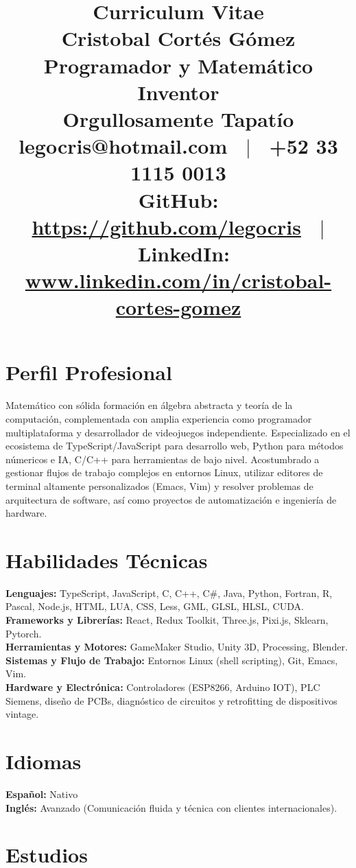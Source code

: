 \documentclass{article}
\title{\vspace{-1.5cm} Curriculum Vitae \\ \Huge{Cristobal Cortés Gómez} \\ \large{Programador y Matemático Inventor} \\ \normalsize{Orgullosamente Tapatío} \\ 
\vspace{0.3cm}
\normalsize{
legocris@hotmail.com \ $|$ \ +52 33 1115 0013 \\
GitHub: \url{https://github.com/legocris} \ $|$ \ LinkedIn: \url{www.linkedin.com/in/cristobal-cortes-gomez}
}
\vspace{-1cm}}
\author{}
\date{}
\begin{document}
\maketitle

\section*{Perfil Profesional}
Matemático con sólida formación en álgebra abstracta y teoría de la computación, complementada con amplia experiencia como programador multiplataforma y  desarrollador de videojuegos independiente. Especializado en el ecosistema de TypeScript/JavaScript para desarrollo web, Python para métodos númericos e IA, C/C++ para herramientas de bajo nivel. Acostumbrado a gestionar flujos de trabajo complejos en entornos Linux, utilizar editores de terminal altamente personalizados (Emacs, Vim) y resolver problemas de arquitectura de software, así como proyectos de automatización e ingeniería de hardware.

\section*{Habilidades Técnicas}
\textbf{Lenguajes:} TypeScript, JavaScript, C, C++, C\#, Java, Python, Fortran, R, Pascal, Node.js, HTML, LUA, CSS, Less, GML, GLSL, HLSL, CUDA. \\
\textbf{Frameworks y Librerías:} React, Redux Toolkit, Three.js, Pixi.js, Sklearn, Pytorch. \\
\textbf{Herramientas y Motores:} GameMaker Studio, Unity 3D, Processing, Blender. \\
\textbf{Sistemas y Flujo de Trabajo:} Entornos Linux (shell scripting), Git, Emacs, Vim. \\
\textbf{Hardware y Electrónica:} Controladores (ESP8266, Arduino IOT), PLC Siemens, diseño de PCBs, diagnóstico de circuitos y retrofitting de dispositivos vintage.

\section*{Idiomas}
\textbf{Español:} Nativo \\
\textbf{Inglés:} Avanzado (Comunicación fluida y técnica con clientes internacionales).

\section*{Estudios}
\end{document}
